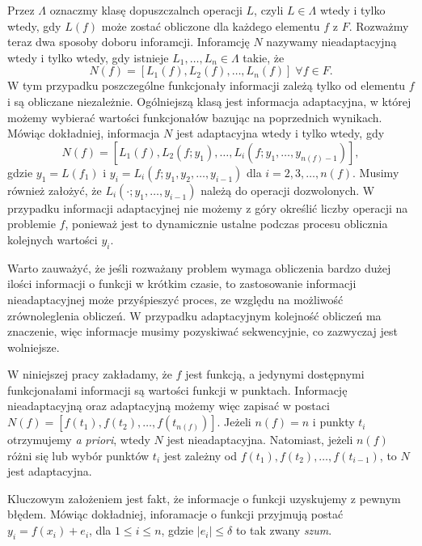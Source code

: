 \documentclass[oik, pdftex, robocza, man]{mgrwms}
\begin{document}
    Przez $\Lambda$ oznaczmy klasę dopuszczalnch operacji $L$, czyli $L \in \Lambda$ wtedy i tylko wtedy, gdy $L(f)$ może zostać obliczone dla każdego elementu $f$ z $F$. Rozważmy teraz dwa sposoby doboru inforamcji. Inforamcję $N$ nazywamy nieadaptacyjną wtedy i tylko wtedy, gdy istnieje $L_{1}, \ldots, L_{n} \in \Lambda$ takie, że
    \begin{equation*}
        N(f) = \left[ L_{1}(f), L_{2}(f), \ldots, L_{n}(f) \right] \; \forall f \in F.
    \end{equation*}
    W tym przypadku poszczególne funkcjonały informacji zależą tylko od elementu $f$ i są obliczane niezależnie.
    Ogólniejszą klasą jest informacja adaptacyjna, w której możemy wybierać wartości funkcjonałów bazując na poprzednich wynikach. Mówiąc dokładniej, informacja $N$ jest adaptacyjna wtedy i tylko wtedy, gdy
    \begin{equation*}
        N(f) = \left[ L_{1}(f), L_{2}(f; y_{1}), \ldots, L_{i}(f; y_{1}, \ldots, y_{n(f)-1}) \right],
    \end{equation*}
    gdzie $y_{1} = L(f_{1})$ i $y_{i} = L_{i}(f; y_{1}, y_{2}, \ldots, y_{i-1})$ dla $i=2,3,\ldots,n(f)$. Musimy również założyć, że $L_{i}(\cdot;y_{1}, \ldots, y_{i-1})$ należą do operacji dozwolonych. W przypadku informacji adaptacyjnej nie możemy z góry określić liczby operacji na problemie $f$, ponieważ jest to dynamicznie ustalne podczas procesu oblicznia kolejnych wartości $y_{i}$.

    Warto zauważyć, że jeśli rozważany problem wymaga obliczenia bardzo dużej ilości informacji o funkcji w krótkim czasie, to zastosowanie informacji nieadaptacyjnej może przyśpieszyć proces, ze względu na możliwość zrównoleglenia obliczeń. W przypadku adaptacyjnym kolejność obliczeń ma znaczenie, więc informacje musimy pozyskiwać sekwencyjnie, co zazwyczaj jest wolniejsze.

    W niniejszej pracy zakładamy, że $f$ jest funkcją, a jedynymi dostępnymi funkcjonałami informacji są wartości funkcji w punktach. Informację nieadaptacyjną oraz adaptacyjną możemy więc zapisać w postaci $N(f) = \left[ f(t_{1}), f(t_{2}), \ldots, f(t_{n(f)}) \right]$. Jeżeli $n(f) = n$ i punkty $t_{i}$ otrzymujemy \textit{a priori}, wtedy $N$ jest nieadaptacyjna. Natomiast, jeżeli $n(f)$ różni się lub wybór punktów $t_{i}$ jest zależny od $f(t_{1}), f(t_{2}), \ldots, f(t_{i-1})$, to $N$ jest adaptacyjna.

    Kluczowym założeniem jest fakt, że informacje o funkcji uzyskujemy z pewnym błędem. Mówiąc dokładniej, inforamacje o funkcji przyjmują postać $y_{i} = f(x_{i}) + e_{i}$, dla $1 \leq i \leq n$, gdzie $|e_{i}| \leq \delta$ to tak zwany \textit{szum}.
    
\end{document}
